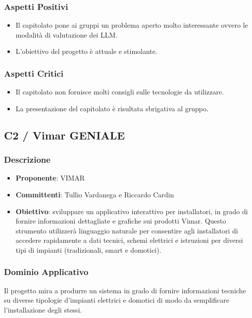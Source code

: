 \documentclass[a4paper, 12pt]{article}
\begin{document}
\subsubsection{Aspetti Positivi}
\begin{itemize}
    \item Il capitolato pone ai gruppi un problema aperto molto interessante ovvero le modalità di valutazione dei LLM.
    \item L'obiettivo del progetto è attuale e stimolante.
\end{itemize}

\subsubsection{Aspetti Critici}
\begin{itemize}
    \item Il capitolato non fornisce molti consigli sulle tecnologie da utilizzare.
    \item La presentazione del capitolato è risultata sbrigativa al gruppo.
\end{itemize}

\subsection{C2 / Vimar GENIALE}

\subsubsection{Descrizione}
\begin{itemize}
    \item \textbf{Proponente}: VIMAR
    \item \textbf{Committenti}: Tullio Vardanega e Riccardo Cardin
    \item \textbf{Obiettivo}: sviluppare un applicativo interattivo per installatori, in grado di fornire informazioni dettagliate e grafiche sui prodotti Vimar. 
    Questo strumento utilizzerà linguaggio naturale per consentire agli installatori di accedere rapidamente a dati tecnici, schemi elettrici e istruzioni per diversi tipi di impianti (tradizionali, smart e domotici).    
\end{itemize}

\subsubsection{Dominio Applicativo}
Il progetto mira a produrre un sistema in grado di fornire informazioni tecniche su diverse tipologie d'impianti elettrici e domotici di modo da semplificare l’installazione degli stessi.
\end{document}
